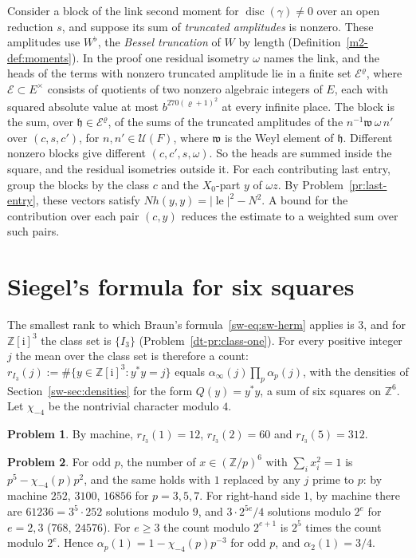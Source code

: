 \documentclass[reqno]{amsart}
\theoremstyle{definition}
\newtheorem{problem}{Problem}[section]
\theoremstyle{plain}
\theoremstyle{remark}
\newcommand{\Z}{\mathbb{Z}}
\newcommand{\ii}{\mathrm{i}}
\newcommand{\Uc}{\mathcal{U}}
\newcommand{\lE}{\operatorname{le}}
\newcommand{\disc}{\operatorname{disc}}
\begin{document}
Consider a block of the link second moment for \(\disc(\gamma)\ne0\) over an open reduction \(s\), and suppose its sum of \emph{truncated amplitudes} is nonzero.  These amplitudes use \(W^\flat\), the \emph{Bessel truncation} of \(W\) by length (Definition~\ref{m2-def:moments}).  In the proof one residual isometry \(\omega\) names the link, and the heads of the terms with nonzero truncated amplitude lie in a finite set \(\mathcal E^\varrho\), where \(\mathcal E\subset E^\times\) consists of quotients of two nonzero algebraic integers of \(E\), each with squared absolute value at most \(b^{270(\varrho+1)^2}\) at every infinite place.  The block is the sum, over \(\mathfrak h\in\mathcal E^\varrho\), of the sums of the truncated amplitudes of the \(n^{-1}\mathfrak w\,\omega\,n'\) over \((c,s,c')\), for \(n,n'\in\Uc(F)\), where \(\mathfrak w\) is the Weyl element of \(\mathfrak h\).  Different nonzero blocks give different \((c,c',s,\omega)\).  So the heads are summed inside the square, and the residual isometries outside it.  For each contributing last entry, group the blocks by the class \(c\) and the \(X_0\)-part \(y\) of \(\omega z\).  By Problem~\ref{pr:last-entry}, these vectors satisfy \(N h(y,y)=\lvert\lE\rvert^2-N^2\).  A bound for the contribution over each pair \((c,y)\) reduces the estimate to a weighted sum over such pairs.

\section{Siegel's formula for six squares}\label{sec:siegel}

The smallest rank to which Braun's formula~\eqref{sw-eq:sw-herm} applies is \(3\), and for \(\Z[\ii]^3\) the class set is \(\{I_3\}\) (Problem~\ref{dt-pr:class-one}).  For every positive integer \(j\) the mean over the class set is therefore a count: \(r_{I_3}(j):=\#\{y\in\Z[\ii]^3:y^*y=j\}\) equals \(\alpha_\infty(j)\prod_p\alpha_p(j)\), with the densities of Section~\ref{sw-sec:densities} for the form \(Q(y)=y^*y\), a sum of six squares on \(\Z^6\).  Let \(\chi_{-4}\) be the nontrivial character modulo \(4\).

\begin{problem}\label{pr:six-squares}
By machine, \(r_{I_3}(1)=12\), \(r_{I_3}(2)=60\) and \(r_{I_3}(5)=312\).
\end{problem}

\begin{problem}\label{pr:local-counts}
For odd \(p\), the number of \(x\in(\Z/p)^6\) with \(\sum_ix_i^2=1\) is \(p^5-\chi_{-4}(p)p^2\), and the same holds with \(1\) replaced by any \(j\) prime to \(p\): by machine \(252\), \(3100\), \(16856\) for \(p=3,5,7\).  For right-hand side \(1\), by machine there are \(61236=3^5\cdot252\) solutions modulo \(9\), and \(3\cdot2^{5e}/4\) solutions modulo \(2^e\) for \(e=2,3\) (\(768\), \(24576\)).  For \(e\ge3\) the count modulo \(2^{e+1}\) is \(2^5\) times the count modulo \(2^e\).  Hence \(\alpha_p(1)=1-\chi_{-4}(p)p^{-3}\) for odd \(p\), and \(\alpha_2(1)=3/4\).
\end{problem}
\end{document}
